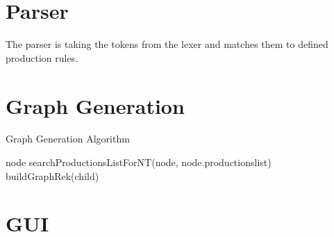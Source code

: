 \section{Parser}\label{sec:ImplementationParser}

The parser is taking the tokens from the lexer and matches them to defined production rules.

\section{Graph Generation}\label{sec:ImplementationGraphGeneration}

\begin{algorithm}[H]
\caption{Graph Generation Algorithm}
\begin{algorithmic}[1] 
\Require node
\State searchProductionsListForNT(node, node.productionslist)
		\State buildGraphRek(child)
	\EndFor
\EndIf
\end{algorithmic}
\end{algorithm}

\section{GUI}\label{sec:GUI}
